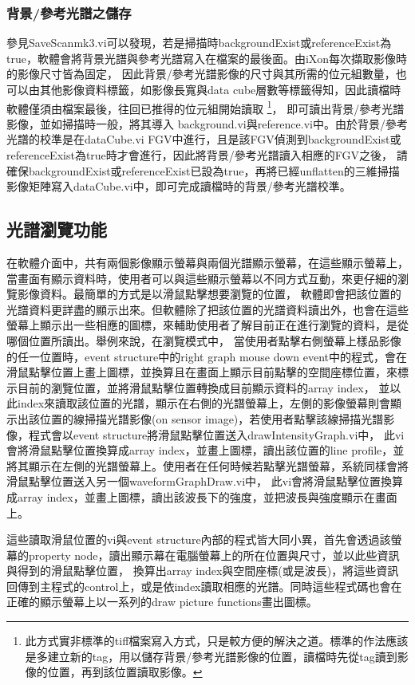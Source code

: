 \documentclass[12pt]{article}
\begin{document}
\subsubsection{背景/參考光譜之儲存}
參見SaveScan\textunderscore mk3.vi可以發現，若是掃描時backgroundExist或referenceExist為true，軟體會將背景光譜與參考光譜寫入在檔案的最後面。由iXon每次擷取影像時的影像尺寸皆為固定，
因此背景/參考光譜影像的尺寸與其所需的位元組數量，也可以由其他影像資料標籤，如影像長寬與data cube層數等標籤得知，因此讀檔時軟體僅須由檔案最後，往回已推得的位元組開始讀取
\footnote{此方式實非標準的tiff檔案寫入方式，只是較方便的解決之道。標準的作法應該是多建立新的tag，用以儲存背景/參考光譜影像的位置，讀檔時先從tag讀到影像的位置，再到該位置讀取影像。}，
即可讀出背景/參考光譜影像，並如掃描時一般，將其導入
background.vi與reference.vi中。由於背景/參考光譜的校準是在dataCube.vi FGV中進行，且是該FGV偵測到backgroundExist或referenceExist為true時才會進行，因此將背景/參考光譜讀入相應的FGV之後，
請確保backgroundExist或referenceExist已設為true，再將已經unflatten的三維掃描影像矩陣寫入dataCube.vi中，即可完成讀檔時的背景/參考光譜校準。

\subsection{光譜瀏覽功能}
在軟體介面中，共有兩個影像顯示螢幕與兩個光譜顯示螢幕，在這些顯示螢幕上，當畫面有顯示資料時，使用者可以與這些顯示螢幕以不同方式互動，來更仔細的瀏覽影像資料。最簡單的方式是以滑鼠點擊想要瀏覽的位置，
軟體即會把該位置的光譜資料更詳盡的顯示出來。但軟體除了把該位置的光譜資料讀出外，也會在這些螢幕上顯示出一些相應的圖標，來輔助使用者了解目前正在進行瀏覽的資料，是從哪個位置所讀出。舉例來說，在瀏覽模式中，
當使用者點擊右側螢幕上樣品影像的任一位置時，event structure中的right graph mouse down event中的程式，會在滑鼠點擊位置上畫上圖標，並換算且在畫面上顯示目前點擊的空間座標位置，來標示目前的瀏覽位置，並將滑鼠點擊位置轉換成目前顯示資料的array index，
並以此index來讀取該位置的光譜，顯示在右側的光譜螢幕上，左側的影像螢幕則會顯示出該位置的線掃描光譜影像(on sensor image)，若使用者點擊該線掃描光譜影像，程式會以event structure將滑鼠點擊位置送入drawIntensityGraph.vi中，
此vi會將滑鼠點擊位置換算成array index，並畫上圖標，讀出該位置的line profile，並將其顯示在左側的光譜螢幕上。使用者在任何時候若點擊光譜螢幕，系統同樣會將滑鼠點擊位置送入另一個waveformGraphDraw.vi中，
此vi會將滑鼠點擊位置換算成array index，並畫上圖標，讀出該波長下的強度，並把波長與強度顯示在畫面上。

這些讀取滑鼠位置的vi與event structure內部的程式皆大同小異，首先會透過該螢幕的property node，讀出顯示幕在電腦螢幕上的所在位置與尺寸，並以此些資訊與得到的滑鼠點擊位置，
換算出array index與空間座標(或是波長)，將這些資訊回傳到主程式的control上，或是依index讀取相應的光譜。同時這些程式碼也會在正確的顯示螢幕上以一系列的draw picture functions畫出圖標。
\end{document}
